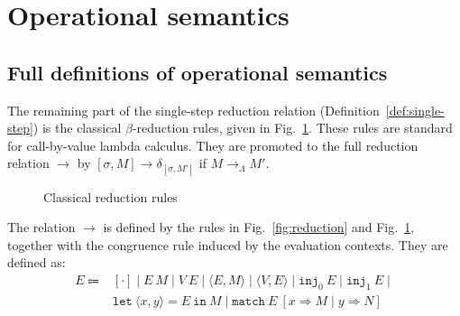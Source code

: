 \section{Operational semantics}
\subsection{Full definitions of operational semantics} \label{sec:opsem-full}
The remaining part of the single-step reduction relation (Definition~\ref{def:single-step}) is the classical $\beta$-reduction rules, given in Fig.~\ref{fig:reduction-beta}.
These rules are standard for call-by-value lambda calculus.
They are promoted to the full reduction relation $\longrightarrow$ by
$[\sigma, M] \longrightarrow \delta_{[\sigma, M']}$ if $M \longrightarrow_\Lambda M'$.
\begin{figure}[ht]
  \caption{Classical reduction rules}
  \label{fig:reduction-beta}
\end{figure}

The relation $\longrightarrow$ is defined by the rules in Fig.~\ref{fig:reduction} and Fig.~\ref{fig:reduction-beta}, together with the congruence rule induced by the evaluation contexts.
They are defined as:
\begin{equation*}
  \begin{array}{rl}
    E \Coloneqq & [\cdot]\mid E\ M\mid V\ E\mid\langle E, M\rangle\mid\langle V,E\rangle\mid\texttt{inj}_0\ E\mid\texttt{inj}_1\ E\mid \\
                & \texttt{let}\ \langle x,y\rangle=E\ \texttt{in}\ M\mid\texttt{match}\ E\ [x\Rightarrow M\mid y\Rightarrow N ]
  \end{array}
\end{equation*}

